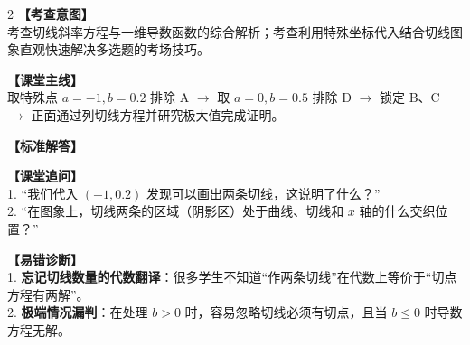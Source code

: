 \documentclass[11pt,a4paper]{ctexart}
\begin{document}
\vspace{0.8em}
\par{}
\vspace{0.8em}

\newpage

\begin{minipage}[t]{0.7\textwidth}
  \vspace{0pt}
  \qFiveStem
  \qFiveOptions
\end{minipage}
\hfill
\begin{minipage}[t]{0.26\textwidth}
  \vspace{0pt}
  \hfill
  \qFiveFigure[0.9]
\end{minipage}

\vspace{0.8em}

\begin{paracol}{2}
  \textbf{【考查意图】}\\
  考查切线斜率方程与一维导数函数的综合解析；考查利用特殊坐标代入结合切线图象直观快速解决多选题的考场技巧。
  
  \textbf{【课堂主线】}\\
  取特殊点 \(a=-1, b=0.2\) 排除 A \(\to\) 取 \(a=0, b=0.5\) 排除 D \(\to\) 锁定 B、C \(\to\) 正面通过列切线方程并研究极大值完成证明。
  
  \textbf{【标准解答】}\\
  \qFiveSolution
  
  \textbf{【课堂追问】}\\
  1. “我们代入 \((-1, 0.2)\) 发现可以画出两条切线，这说明了什么？”\\
  2. “在图象上，切线两条的区域（阴影区）处于曲线、切线和 \(x\) 轴的什么交织位置？”
  
  \switchcolumn
  \textbf{【易错诊断】}\\
  1. \textbf{忘记切线数量的代数翻译}：很多学生不知道“作两条切线”在代数上等价于“切点方程有两解”。\\
  2. \textbf{极端情况漏判}：在处理 \(b>0\) 时，容易忽略切线必须有切点，且当 \(b \leqslant 0\) 时导数方程无解。
\end{paracol}

\vspace{0.8em}
\par{}
\vspace{0.8em}

\qEightStem
\qEightOptions
\end{document}
